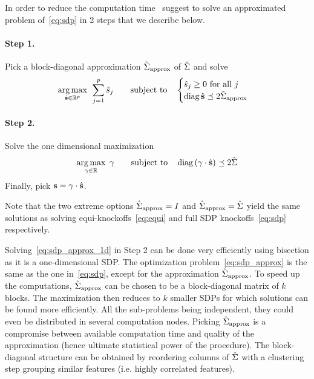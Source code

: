 In order to reduce the computation time~\cite{model_x_knockoffs}
suggest to solve an approximated problem of~\ref{eq:sdp} in 2 steps that we describe below.
\paragraph*{Step 1.}
Pick a block-diagonal approximation $\hat{\Sigma}_\text{approx}$ of $\hat{\Sigma}$ and solve
\begin{equation}\label{eq:sdp_approx}
    \underset{\hat{\mathbf{s}} \in \mathbb{R}^p}{\operatorname*{arg\,max}}\;\,
    \sum_{j = 1}^p \hat{s}_j
    \qquad
    \text{subject to}\quad \begin{cases}
        \hat{s}_j \geq 0\text{ for all } j\\
        \operatorname*{diag} \hat{\mathbf{s}} \preceq 2\hat{\Sigma}_\text{approx}
    \end{cases}
\end{equation}
\paragraph*{Step 2.}
Solve the one dimensional maximization
\begin{equation}\label{eq:sdp_approx_1d}
    \underset{\gamma \in \mathbb{R}}{\operatorname*{arg\,max}}\;\,\gamma
    \qquad\text{subject to}\quad
    \operatorname*{diag}\left( \gamma \cdot \hat{\mathbf{s}} \right) \preceq 2\hat{\Sigma}
\end{equation}
Finally, pick $\mathbf{s} = \gamma \cdot \hat{\mathbf{s}}$.
\begin{remark}
    Note that the two extreme options $\hat{\Sigma}_\text{approx} = I$ and $\hat{\Sigma}_\text{approx} = \hat{\Sigma}$ yield
    the same solutions as solving equi-knockoffs~\ref{eq:equi} and full SDP knockoffs~\ref{eq:sdp} respectively.
\end{remark}
Solving~\ref{eq:sdp_approx_1d} in Step 2 can be done very efficiently using bisection as it is a one-dimensional SDP\@.
The optimization problem~\ref{eq:sdp_approx} is the same as the one in~\ref{eq:sdp},
except for the approximation $\hat{\Sigma}_\text{approx}$.
To speed up the computations,
$\hat{\Sigma}_\text{approx}$ can be chosen to be a block-diagonal matrix of $k$ blocks.
The maximization then reduces to $k$ smaller SDPs for which solutions can be found more efficiently.
All the sub-problems being independent, they could even be distributed in several computation nodes.
Picking $\hat{\Sigma}_\text{approx}$ is a compromise between available computation time and quality of the approximation
(hence ultimate statistical power of the procedure).
The block-diagonal structure can be obtained by reordering columns of $\hat{\Sigma}$
with a clustering step grouping similar features (i.e. highly correlated features).

